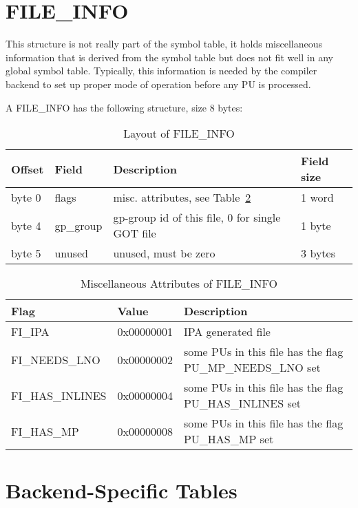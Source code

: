 \section{FILE\_INFO}

This structure is not really part of the symbol table, it holds
miscellaneous information that is derived from the symbol table but
does not fit well in any global symbol table. Typically, this
information is needed by the compiler backend to set up proper mode of
operation before any
%
PU is processed.

A
%
FILE\_INFO has the following structure, size 8 bytes:

\begin{table}[h]
\centering
\caption{Layout of FILE\_INFO}
\label{Table_39} 
\begin{tabular}{|l|l|l|l|}\hline
Offset &Field & Description & Field size \\\hline\hline
byte 0 & flags & misc. attributes, see Table~\ref{table40} & 1 word \\\hline
byte 4 & gp\_group & gp-group id of this file, 0 for single
\index{GOT}%
GOT file & 1 byte\\\hline
byte 5 & unused & unused, must be zero & 3 bytes\\\hline
\end{tabular}
\end{table}

\begin{table}[h]
\centering
\caption{Miscellaneous Attributes of FILE\_INFO}
\label{table40} 
\begin{tabular}{|l|l|l|}\hline
Flag & Value & Description\\\hline\hline
\index{FI\_IPA}%
FI\_IPA &0x00000001 &IPA generated file\\\hline
\index{FI\_NEEDS\_LNO}%
FI\_NEEDS\_LNO &0x00000002 &some PUs in this file has the flag
\index{PU\_MP\_NEEDS\_LNO}%
PU\_MP\_NEEDS\_LNO set\\\hline
\index{FI\_HAS\_INLINES}%
FI\_HAS\_INLINES &0x00000004 &some PUs in this file has the flag
\index{PU\_HAS\_INLINES}%
PU\_HAS\_INLINES set\\\hline
\index{FI\_HAS\_MP}%
FI\_HAS\_MP &0x00000008 &some PUs in this file has the flag
\index{PU\_HAS\_MP}%
PU\_HAS\_MP set\\\hline
\end{tabular}
\end{table}



\section{Backend-Specific Tables}

